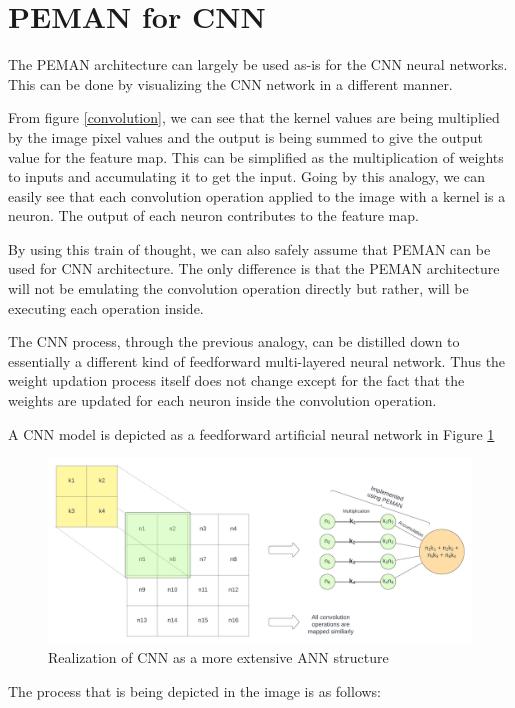 \documentclass[wide]{adonis}
\begin{document}
\section{PEMAN for CNN}

The PEMAN architecture can largely be used as-is for the CNN neural networks. This can be done by visualizing the CNN network in a different manner.

From figure \ref{convolution}, we can see that the kernel values are being multiplied by the image pixel values and the output is being summed to give the output value for the feature map. This can be simplified as the multiplication of weights to inputs and accumulating it to get the input. Going by this analogy, we can easily see that each convolution operation applied to the image with a kernel is a neuron. The output of each neuron contributes to the feature map.

By using this train of thought, we can also safely assume that PEMAN can be used for CNN architecture. The only difference is that the PEMAN architecture will not be emulating the convolution operation directly but rather, will be executing each operation inside.

The CNN process, through the previous analogy, can be distilled down to essentially a different kind of feedforward multi-layered neural network. Thus the weight updation process itself does not change except for the fact that the weights are updated for each neuron inside the convolution operation.

A CNN model is depicted as a feedforward artificial neural network in Figure \ref{cnn_as_ann}

\begin{figure}
	\centering
	\includegraphics[width=\textwidth]{images/cnn_as_ann3.png}
	\caption{Realization of CNN as a more extensive ANN structure}
	\label{cnn_as_ann}
\end{figure}

The process that is being depicted in the image is as follows:
\end{document}
